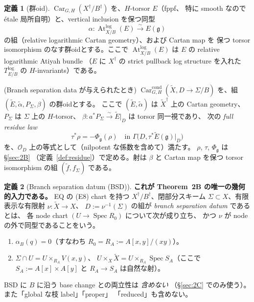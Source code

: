 \documentclass[11pt,a4paper]{article}
\numberwithin{equation}{section}
\theoremstyle{definition}
\newtheorem{definition}{定義}[section]
\newcommand{\g}{\mathfrak g}
\newcommand{\Atlog}{\operatorname{At}^{\log}}
\newcommand{\tX}{\widetilde X}
\newcommand{\tE}{\widetilde E}
\newcommand{\tal}{\widetilde\alpha}
\newcommand{\Car}{\operatorname{Car}}
\begin{document}
\begin{definition}[群oid]\label{def:groupoids}
\(\Car_{G,H}(X^\dagger/B^\dagger)\) を、\(H\)-torsor \(E\)（fppf、
特に smooth なので étale 局所自明）と、vertical inclusion を保つ同型
\[
  \alpha:\Atlog_{X/B}(E)\xrightarrow{\ \sim\ }E(\g)
\]
の組（relative logarithmic Cartan geometry）、および Cartan map を
保つ torsor isomorphism のなす群oidとする。ここで
\(\Atlog_{X/B}(E)\) は \(E\) の relative logarithmic Atiyah bundle
（\(E\) に \(X^\dagger\) の strict pullback log structure を入れた
\(T^{\log}_{E/B}\) の \(H\)-invariants）である。

(Branch separation data が与えられたとき) \(\Car^{\mathrm{cond}}_{G,H}
(\tX,D\to\Sigma/B)\) を、組 \((\tE,\tal,P_\Sigma,\beta)\) の群oidとする。
ここで \((\tE,\tal)\) は \(\tX^\dagger\) 上の Cartan geometry、
\(P_\Sigma\) は \(\Sigma\) 上の \(H\)-torsor、
\(\beta:a^*P_\Sigma\xrightarrow{\sim}\tE|_D\) は torsor 同一視であり、
次の \emph{full residue law}
\begin{equation}\label{eq:residue-law}
  \tau^*\rho=-\Phi_{\g}(\rho)\quad\text{in }\Gamma\bigl(D,\tau^*\tE(\g)|_D\bigr)
\end{equation}
を、\(\mathcal O_D\) 上の等式として（nilpotent な係数を含めて）満たす。
\(\rho\), \(\tau\), \(\Phi_{\g}\) は \S\ref{sec:2B}
（定義~\ref{def:residue}）で定める。射は
\(\beta\) と Cartan map を保つ torsor isomorphism の組 \((\tilde f,f_\Sigma)\)
である。
\end{definition}

\begin{definition}[Branch separation datum (BSD)]\label{def:BSD}
\textbf{これが Theorem~2B の唯一の幾何的入力である。}
EQ の (E8) chart を持つ \(X^\dagger/B^\dagger\)、閉部分スキーム
\(\Sigma\subset X\)、有限表示な有限射 \(\nu:\tX\to X\)、
\(D:=\nu^{-1}(\Sigma)\) の組が \emph{branch separation datum} であるとは、
各 node chart \((U\to\operatorname{Spec}R_0)\) について次が成り立ち、
かつ \(\nu\) が node の外で同型であることをいう。
\begin{enumerate}[label=(BS\arabic*)]
\item \(\alpha_B(q)=0\)（すなわち \(R_0=R_A:=A[x,y]/(xy)\)）。
\item \(\Sigma\cap U=U\times_{R_A}V(x,y)\)、
  \(U\times_X\tX=U\times_{R_A}\operatorname{Spec}S_A\)（ここで
  \(S_A:=A[x]\times A[y]\) と \(R_A\to S_A\) は自然な射）。
\end{enumerate}
\end{definition}

BSD に \(B\) に沿う base change との両立性は \emph{含めない}
（\S\ref{sec:2C} でのみ使う）。また「global な枝 label」「proper」
「reduced」も含めない。
\end{document}
